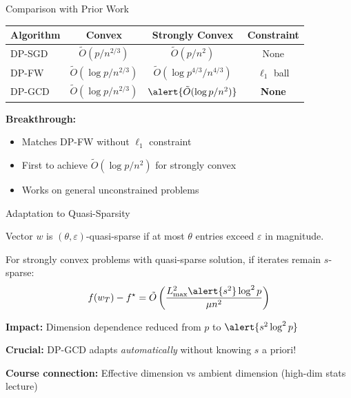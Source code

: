 \documentclass[10pt]{beamer}
\begin{document}
\begin{frame}{Comparison with Prior Work}
\begin{table}
\footnotesize
\begin{tabular}{@{}lccc@{}}
\toprule
\textbf{Algorithm} & \textbf{Convex} & \textbf{Strongly Convex} & \textbf{Constraint} \\
\midrule
DP-SGD & $\tilde{O}(p/n^{2/3})$ & $\tilde{O}(p/n^2)$ & None \\
DP-FW & $\tilde{O}(\log p/n^{2/3})$ & $\tilde{O}(\log p^{4/3}/n^{4/3})$ & $\ell_1$ ball \\
\rowcolor{yellow!30}
DP-GCD & $\tilde{O}(\log p/n^{2/3})$ & $\alert{\tilde{O}(\log p/n^2)}$ & \textbf{None} \\
\bottomrule
\end{tabular}
\end{table}

\vspace{1em}
\textbf{Breakthrough:}
\begin{itemize}
\item Matches DP-FW without $\ell_1$ constraint
\item \alert{First} to achieve $\tilde{O}(\log p / n^2)$ for strongly convex
\item Works on general unconstrained problems
\end{itemize}

\end{frame}

\begin{frame}{Adaptation to Quasi-Sparsity}
\begin{definition}
Vector $w$ is $(\theta, \varepsilon)$-quasi-sparse if at most $\theta$ entries exceed $\varepsilon$ in magnitude.
\end{definition}

\vspace{1em}
\begin{theorem}
For strongly convex problems with quasi-sparse solution, if iterates remain $s$-sparse:
\[
f(w_T) - f^\star = \tilde{O}\left( \frac{L_{\max}^2 \alert{s^2} \log^2 p}{\mu n^2} \right)
\]
\end{theorem}

\vspace{1em}
\textbf{Impact:} Dimension dependence reduced from $p$ to $\alert{s^2 \log^2 p}$

\vspace{0.5em}
\textbf{Crucial:} DP-GCD adapts \emph{automatically} without knowing $s$ a priori!

\vspace{0.3em}
\textbf{Course connection:} Effective dimension vs ambient dimension (high-dim stats lecture)
\end{frame}
\end{document}
